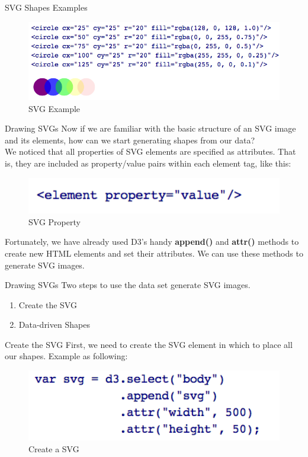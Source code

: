 \documentclass{beamer}
\begin{document}
\begin{frame}{SVG Shapes Examples} 
\begin{figure}
\includegraphics[width=1.0\textwidth]{./images/SVG_example.png}
\caption{\label{fig:svgexample} SVG Example}
\end{figure}
\end{frame}

\begin{frame}{Drawing SVGs}
Now if we are familiar with the basic structure of an SVG image and its elements, how can we start generating shapes from our data? \\
We noticed that all properties of SVG elements are specified as attributes. That is, they are included as property/value pairs within each element tag, like this: 
\begin{figure}
\includegraphics[width=1.0\textwidth]{./images/svg_property.png}
\caption{\label{fig:svgproperty} SVG Property}
\end{figure}
Fortunately, we have already used D3's handy \textbf{append()} and \textbf{attr()} methods to create new HTML elements and set their attributes. We can use these methods to generate SVG images. 
\end{frame}

\begin{frame} {Drawing SVGs}
Two steps to use the data set generate SVG images. 
\begin{enumerate}
	\item Create the SVG
	\item Data-driven Shapes 
\end{enumerate}
\end{frame}

\begin{frame}{Create the SVG}
First, we need to create the SVG element in which to place all our shapes. Example as following:
\begin{figure}
\includegraphics[width=1.0\textwidth]{./images/create_SVG.png}
\caption{\label{fig:svgcreate} Create a SVG}
\end{figure}
\end{frame}
\end{document}
